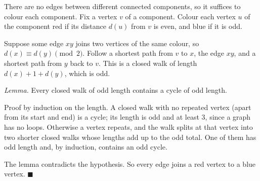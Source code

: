 There are no edges between different connected components, so it suffices to colour each component. Fix a vertex $v$ of a component. Colour each vertex $u$ of the component red if its distance $d(u)$ from $v$ is even, and blue if it is odd.

Suppose some edge $xy$ joins two vertices of the same colour, so $d(x)\equiv d(y)\pmod2$. Follow a shortest path from $v$ to $x$, the edge $xy$, and a shortest path from $y$ back to $v$. This is a closed walk of length $d(x)+1+d(y)$, which is odd.

\emph{Lemma.} Every closed walk of odd length contains a cycle of odd length.

Proof by induction on the length. A closed walk with no repeated vertex (apart from its start and end) is a cycle; its length is odd and at least $3$, since a graph has no loops. Otherwise a vertex repeats, and the walk splits at that vertex into two shorter closed walks whose lengths add up to the odd total. One of them has odd length and, by induction, contains an odd cycle.

The lemma contradicts the hypothesis. So every edge joins a red vertex to a blue vertex. $\blacksquare$
